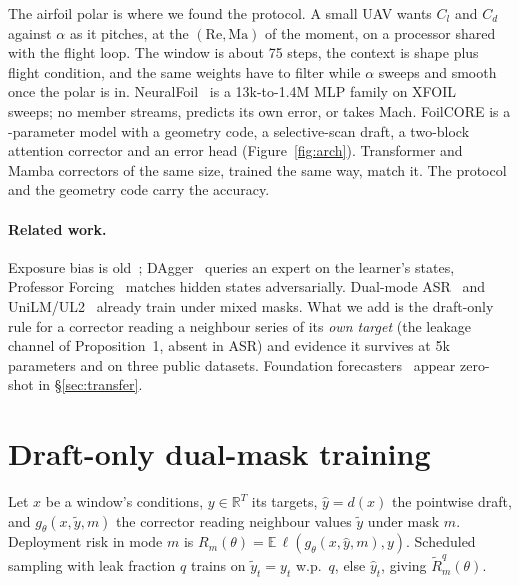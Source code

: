 \documentclass{article}
\begin{document}
The airfoil polar is where we found the protocol. A small UAV wants $C_l$ and $C_d$ against $\alpha$ as it pitches, at the $(\mathrm{Re},\mathrm{Ma})$ of the moment, on a processor shared with the flight loop. The window is about 75 steps, the context is shape plus flight condition, and the same weights have to filter while $\alpha$ sweeps and smooth once the polar is in. NeuralFoil~\citep{neuralfoil} is a 13k-to-1.4M MLP family on XFOIL~\citep{xfoil} sweeps; no member streams, predicts its own error, or takes Mach. FoilCORE is a \NParamsMain-parameter model with a geometry code, a selective-scan draft, a two-block attention corrector and an error head (Figure~\ref{fig:arch}). Transformer and Mamba correctors of the same size, trained the same way, match it. The protocol and the geometry code carry the accuracy.

\paragraph{Related work.} Exposure bias is old~\citep{ranzato2016sequence}; DAgger~\citep{ross2011dagger} queries an expert on the learner's states, Professor Forcing~\citep{lamb2016professor} matches hidden states adversarially. Dual-mode ASR~\citep{yu2021dualmode,zhang2020u2} and UniLM/UL2~\citep{dong2019unilm,tay2023ul2} already train under mixed masks. What we add is the draft-only rule for a corrector reading a neighbour series of its \emph{own target} (the leakage channel of Proposition~1, absent in ASR) and evidence it survives at 5k parameters and on three public datasets. Foundation forecasters~\citep{ansari2024chronos,das2024timesfm,ekambaram2024ttm} appear zero-shot in \S\ref{sec:transfer}.

\section{Draft-only dual-mask training}
\label{sec:recipe}
Let $x$ be a window's conditions, $y\in\mathbb{R}^T$ its targets, $\hat y=d(x)$ the pointwise draft, and $g_\theta(x,\tilde y,m)$ the corrector reading neighbour values $\tilde y$ under mask $m$. Deployment risk in mode $m$ is $R_m(\theta)=\mathbb{E}\,\ell(g_\theta(x,\hat y,m),y)$. Scheduled sampling with leak fraction $q$ trains on $\tilde y_t=y_t$ w.p.\ $q$, else $\hat y_t$, giving $\tilde R^q_m(\theta)$.
\end{document}
